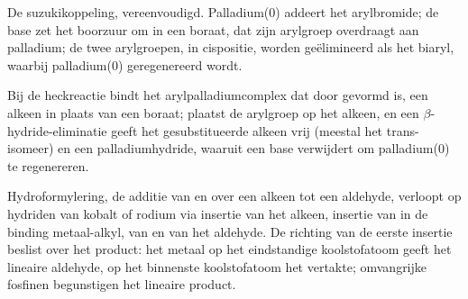 \begin{omfigure}

{\small De suzukikoppeling, vereenvoudigd. Palladium(0) addeert het arylbromide; de base
zet het boorzuur om in een boraat, dat zijn arylgroep overdraagt aan palladium; de twee
arylgroepen, in cispositie, worden geëlimineerd als het biaryl, waarbij palladium(0) geregenereerd wordt.}
\end{omfigure}

Bij de heckreactie bindt het arylpalladiumcomplex dat door  gevormd is, een
alkeen in plaats van een boraat;  plaatst de arylgroep op het alkeen, en een
$\beta$-hydride-eliminatie geeft het gesubstitueerde alkeen vrij (meestal het trans-isomeer)
en een palladiumhydride, waaruit een base  verwijdert om palladium(0) te regenereren.

Hydroformylering, de additie van  en  over een alkeen tot een aldehyde,
verloopt op hydriden van kobalt of rodium via insertie van het alkeen, insertie van 
in de binding metaal-alkyl,  van  en  van het
aldehyde. De richting van de eerste insertie beslist over het product: het metaal op het
eindstandige koolstofatoom geeft het lineaire aldehyde, op het binnenste koolstofatoom het vertakte; omvangrijke
fosfinen begunstigen het lineaire product.

